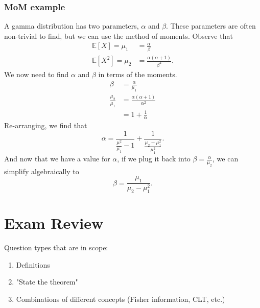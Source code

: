 \documentclass[titlepage, 12pt, leqno]{article}
\begin{document}
\subsubsection{MoM example}

A gamma distribution has two parameters, $\alpha$ and $\beta$. These parameters
are often non-trivial to find, but we can use the method of moments. Observe
that
\begin{align*}
    \mathbb{E}[X] = \mu_{1} &= \frac{\alpha}{\beta} \\
    \mathbb{E}[X^{2}] = \mu_{2} &= \frac{\alpha(\alpha+1)}{\beta^{2}}.
\end{align*}
We now need to find $\alpha$ and $\beta$ in terms of the moments.
\begin{align*}
    \beta &= \frac{\alpha}{\mu_{1}} \\
    \frac{\mu_{2}}{\mu_{1}} &= \frac{\alpha(\alpha+1)}{\alpha^{2}} \\
    &= 1 + \frac{1}{\alpha}
\end{align*}
Re-arranging, we find that
\[
    \alpha = \frac{1}{\frac{\mu^{2}}{\mu_{1}}-1} + \frac{1}{\frac{\mu_{2} -
        \mu_{1}^{2}}{\mu_{1}^{2}}}.
\]
And now that we have a value for $\alpha$, if we plug it back into
$\beta = \frac{\alpha}{\mu_{2}}$, we can simplify algebraically to
\[
    \beta = \frac{\mu_{1}}{\mu_{2} - \mu_{1}^{2}}.
\]

\pagebreak
\section{Exam Review}

Question types that are in scope:
\begin{enumerate}
    \item Definitions
    \item "State the theorem"
    \item Combinations of different concepts (Fisher information, CLT, etc.)
\end{enumerate}
\end{document}
